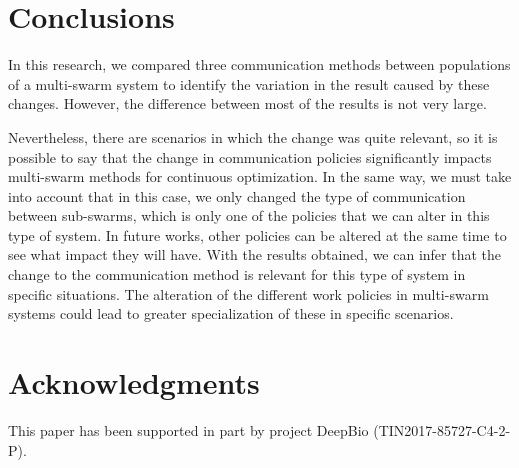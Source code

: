 \documentclass[runningheads]{llncs}
\begin{document}
\section{Conclusions}

In this research, we compared three communication methods between
populations of a multi-swarm system to identify the variation in the
result caused by these changes. However, the difference between most
of the results is not very large.

Nevertheless, there are scenarios in
which the change was quite relevant, so it is possible to say that the
change in communication policies significantly impacts multi-swarm
methods for continuous optimization. In the same way, we must take
into account that in this case, we only changed the type of
communication between sub-swarms, which is only one of the policies
that we can alter in this type of system. In future works, other
policies can be altered at the same time to see what impact they will
have. With the results obtained, we can infer that the change to the
communication method is relevant for this type of system in specific
situations. The alteration of the different work policies in
multi-swarm systems could lead to greater specialization of these in
specific scenarios.

\section*{Acknowledgments}

This paper has been supported in part by project DeepBio (TIN2017-85727-C4-2-P).


\printbibliography
\end{document}
